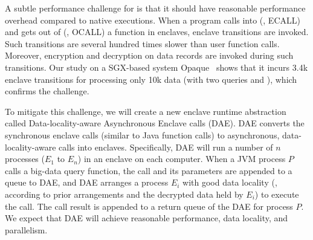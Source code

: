 


A subtle performance challenge for \maat is that it should have reasonable 
performance overhead compared to native executions. When a program calls into 
(\ie, ECALL) and gets out of (\ie, OCALL) a function in enclaves, enclave 
transitions are invoked. Such transitions are several hundred times slower than 
user function calls. Moreover, encryption and decryption on data records are 
invoked during such transitions. Our study on a SGX-based system 
Opaque~\cite{opaque:nsdi17} shows that it incurs 3.4k enclave transitions for 
processing only 10k data (with two queries  and ), which 
confirms the challenge.





To mitigate this challenge, we will create a new enclave runtime abstraction 
called Data-locality-aware Asynchronous Enclave calls (DAE). DAE converts the 
synchronous enclave calls (similar to Java function calls) to asynchronous, 
data-locality-aware calls into enclaves. Specifically, DAE will run a number of 
$n$ processes ($E_{1}$ to $E_{n}$) in an enclave on each computer. When a 
JVM process $P$ calls a big-data query function, the call and its parameters 
are appended to a queue to DAE, and DAE arranges a process $E_{i}$ with good 
data locality (\eg, according to prior arrangements and the decrypted data 
held by $E_{i}$) to execute the call. The call result is appended to a return 
queue of the DAE for process $P$. We expect that DAE will achieve reasonable 
performance, data locality, and parallelism.

